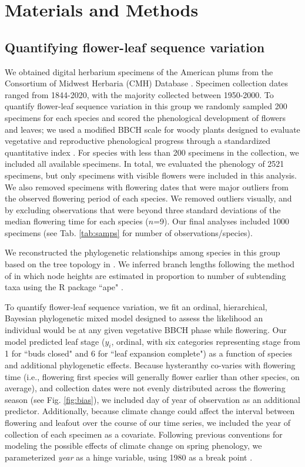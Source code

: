 \documentclass{article}[12pt]
\begin{document}
\section*{Materials and Methods}
\subsection*{Quantifying flower-leaf sequence variation}  
We obtained digital herbarium specimens of the American plums from the Consortium of Midwest Herbaria (CMH) Database \citep{CMH}. Specimen collection dates ranged from 1844-2020, with the majority collected between 1950-2000. To quantify flower-leaf sequence variation in this group we randomly sampled 200 specimens for each species and scored the phenological development of flowers and leaves; we used a modified BBCH scale for woody plants  designed to evaluate vegetative and reproductive phenological progress through a standardized quantitative index \citep{Finn2007}. For species with less than 200 specimens in the collection, we included all available specimens. In total, we evaluated the phenology of 2521 specimens, but only specimens with visible flowers were included in this analysis. We also removed specimens with flowering dates that were major outliers from the observed flowering period of each species. We removed outliers visually, and by excluding observations that were beyond three standard deviations of the median flowering time for each species ($n$=9). Our final analyses included 1000 specimens (see Tab. \ref{tab:samps} for number of observations/species). 

We reconstructed the phylogenetic relationships among species in this group based on the tree topology in \citet{Shaw:2004aa}. We inferred branch lengths following the method of \citet{Granfen1989} in which node heights are estimated in proportion to number of subtending taxa using the R package ``ape" \citep{Paradis2019}.

To quantify flower-leaf sequence variation, we fit an ordinal, hierarchical, Bayesian phylogenetic mixed model \citep{Garamszegi2014} designed to assess the likelihood an individual would be at any given vegetative BBCH phase while flowering. Our model predicted leaf stage ($y_i$, ordinal, with six categories representing stage from 1 for ``buds closed" and 6 for ``leaf expansion complete") as a function of species and additional phylogenetic effects. Because hysteranthy co-varies with flowering time (i.e., flowering first species will generally flower earlier than other species, on average), and collection dates were not evenly distributed across the flowering season (see Fig. \ref{fig:bias}), we included day of year of observation as an additional predictor. Additionally, because climate change could affect the interval between flowering and leafout over the course of our time series, we included the year of collection of each specimen as a covariate. Following previous conventions for modeling the possible effects of climate change on spring phenology, we parameterized \emph{year} as a hinge variable, using 1980 as a break point \citep{IPCC2013,Buonaiuto2020}. 
\end{document}
